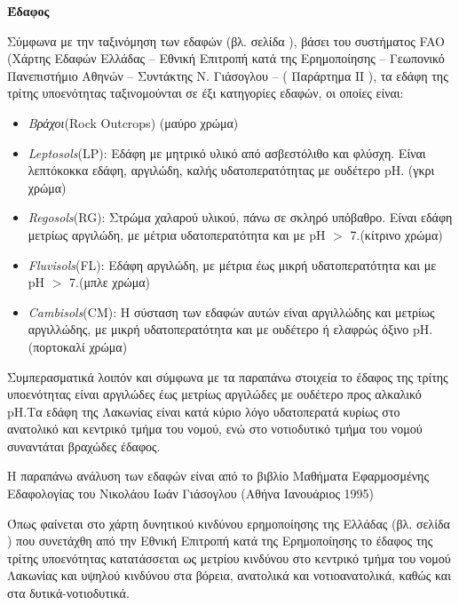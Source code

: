 \documentclass[12pt]{article}
\newcommand{\gr}{\selectlanguage{greek}}
\newcommand{\eng}{\selectlanguage{english}}
\begin{document}
	\textbf{Έδαφος}
	
	Σύμφωνα με την ταξινόμηση των εδαφών (βλ. σελίδα \pageref{edafi}), βάσει του συστήματος FAO (Χάρτης Εδαφών Ελλάδας – Εθνική Επιτροπή κατά της Ερημοποίησης – Γεωπονικό Πανεπιστήμιο Αθηνών – Συντάκτης Ν. Γιάσογλου – ( Παράρτημα IΙ ), τα εδάφη της τρίτης υποενότητας ταξινομούνται σε έξι κατηγορίες εδαφών, οι οποίες είναι:
	
	\begin{itemize}
		\item \emph{Βράχοι}(Rock Outcrops) (μαύρο χρώμα)
		\item \emph{Leptosols}(LP): Εδάφη με μητρικό υλικό από ασβεστόλιθο και φλύσχη. Είναι λεπτόκοκκα εδάφη, αργιλώδη, καλής υδατοπερατότητας με ουδέτερο pH. (γκρι χρώμα)
		\item \emph{Regosols}(RG): Στρώμα χαλαρού υλικού, πάνω σε σκληρό υπόβαθρο. Είναι εδάφη μετρίως αργιλώδη, με μέτρια υδατοπερατότητα και με pH $>$ 7.(κίτρινο χρώμα)
		\item \emph{Fluvisols}(FL): Εδάφη αργιλώδη, με μέτρια έως μικρή υδατοπερατότητα και με pH $>$ 7.(μπλε χρώμα)
		\item \emph{Cambisols}(CM): Η σύσταση των εδαφών αυτών είναι αργιλλώδης και μετρίως αργιλλώδης, με μικρή υδατοπερατότητα και με ουδέτερο ή ελαφρώς όξινο pH. (πορτοκαλί χρώμα)
	\end{itemize}

	Συμπερασματικά λοιπόν και σύμφωνα με τα παραπάνω στοιχεία το έδαφος της τρίτης υποενότητας  είναι αργιλώδες έως μετρίως αργιλώδες  με ουδέτερο προς αλκαλικό \eng pH.\gr Τα εδάφη της Λακωνίας είναι κατά κύριο λόγο υδατοπερατά κυρίως στο ανατολικό και κεντρικό τμήμα του νομού, ενώ στο νοτιοδυτικό τμήμα του νομού συναντάται βραχώδες έδαφος. 
	
	Η παραπάνω ανάλυση των εδαφών είναι από το βιβλίο Μαθήματα Εφαρμοσμένης Εδαφολογίας του Νικολάου Ιωάν Γιάσογλου (Αθήνα  Ιανουάριος 1995)
	
	Όπως φαίνεται στο χάρτη δυνητικού κινδύνου ερημοποίησης της Ελλάδας (βλ. σελίδα \pageref{erimopoiisi}) που συνετάχθη από την Εθνική Επιτροπή κατά της Ερημοποίησης το έδαφος της τρίτης υποενότητας κατατάσσεται ως μετρίου κινδύνου στο κεντρικό τμήμα του νομού Λακωνίας και υψηλού κινδύνου στα βόρεια, ανατολικά και νοτιοανατολικά, καθώς και στα δυτικά-νοτιοδυτικά.
	
\end{document}
